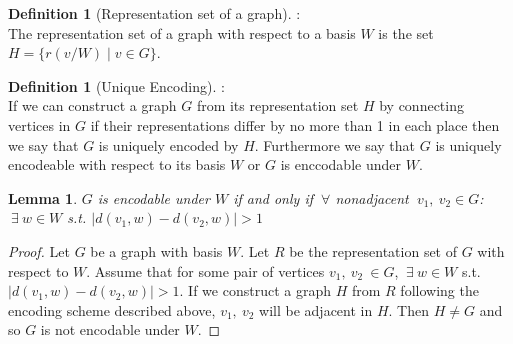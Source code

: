 \documentclass[11pt]{amsart}
\theoremstyle{plain}  %
\newtheorem{lem}[thm]{Lemma}
\theoremstyle{definition}
\newtheorem{defin}[thm]{{Definition}}
\theoremstyle{remark}
\numberwithin{equation}{thm}
\begin{document}
  \begin{defin}[Representation set of a graph]:\\
  The representation set of a graph with respect to a basis $W$ is the set $H=\{r(v/W)\mid v\in G\}$.   
  \end{defin}

  \begin{defin}[Unique Encoding]:\\
   If we can construct a graph $G$ from its representation set $H$ by connecting vertices in $G$ 
   if their representations differ by no more than 1 in each place then we say that $G$ is uniquely encoded by $H$.
   Furthermore we say that $G$ is uniquely encodeable with respect to its basis $W$ or $G$ is enccodable under $W$.
  \end{defin}

\begin{lem}
$G$ is encodable under $W$ if and only if $\ \forall$ nonadjacent $\ v_1,\ v_2\in G$:\\
$\ \exists\ w \in W$ s.t. $\left| d(v_1,w)-d(v_2,w)\right| > 1$ 
\end{lem}
\begin{proof}
Let $G$ be a graph with basis $W$. Let $R$ be the representation set of $G$ with respect to $W$. 
Assume that for some pair of vertices $v_1,\ v_2\ \in G$, $\ \exists\ w \in W$ s.t. $\left| d(v_1,w)-d(v_2,w)\right| > 1$.
If we construct a graph $H$ from $R$ following the encoding scheme described above, $v_1,\ v_2$ will be adjacent in $H$. 
Then $H \neq G$ and so $G$ is not encodable under $W$.
\end{proof}
\end{document}
